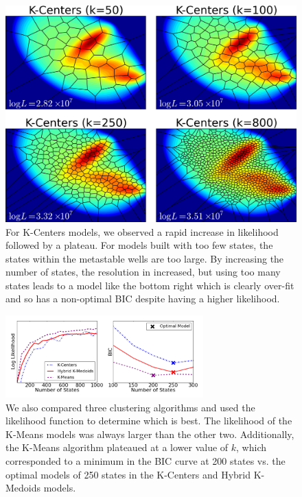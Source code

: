 \documentclass[twocolumn,floatfix,nofootinbib,aps]{revtex4-1}
\begin{document}
\begin{figure}
\includegraphics[width=5in]{figs/kcent_vors.png}
\caption{For K-Centers models, we observed a rapid increase in likelihood followed by a plateau. For models built with too few states, the states within the metastable wells are too large. By increasing the number of states, the resolution in increased, but using too many states leads to a model like the bottom right which is clearly over-fit and so has a non-optimal BIC despite having a higher likelihood.}
\end{figure}

\begin{figure}
\includegraphics[width=3in]{figs/cluster_comp.png}
\caption{We also compared three clustering algorithms and used the likelihood function to determine which is best. The likelihood of the K-Means models was always larger than the other two. Additionally, the K-Means algorithm plateaued at a lower value of $k$, which corresponded to a minimum in the BIC curve at 200 states vs. the optimal models of 250 states in the K-Centers and Hybrid K-Medoids models.} \end{figure}
\end{document}
